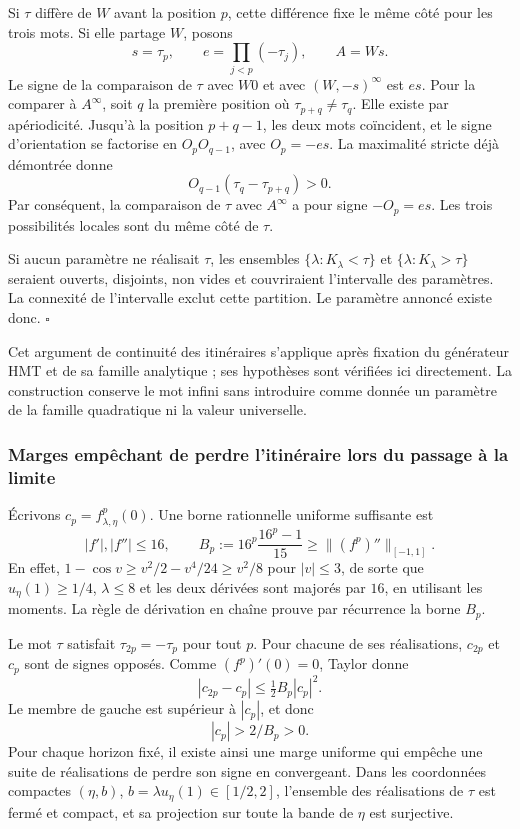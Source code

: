 Si \(\tau\) diffère de \(W\) avant la position \(p\), cette différence fixe le même côté pour les trois mots. Si elle partage \(W\), posons
\[
s=\tau_p,\qquad e=\prod_{j<p}(-\tau_j),\qquad A=Ws.
\]
Le signe de la comparaison de \(\tau\) avec \(W0\) et avec \((W,-s)^\infty\) est \(es\). Pour la comparer à \(A^\infty\), soit \(q\) la première position où \(\tau_{p+q}\ne\tau_q\). Elle existe par apériodicité. Jusqu’à la position \(p+q-1\), les deux mots coïncident, et le signe d’orientation se factorise en \(O_pO_{q-1}\), avec \(O_p=-es\). La maximalité stricte déjà démontrée donne
\[
O_{q-1}(\tau_q-\tau_{p+q})>0.
\]
Par conséquent, la comparaison de \(\tau\) avec \(A^\infty\) a pour signe \(-O_p=es\). Les trois possibilités locales sont du même côté de \(\tau\).

Si aucun paramètre ne réalisait \(\tau\), les ensembles \(\{\lambda:K_\lambda<\tau\}\) et \(\{\lambda:K_\lambda>\tau\}\) seraient ouverts, disjoints, non vides et couvriraient l’intervalle des paramètres. La connexité de l’intervalle exclut cette partition. Le paramètre annoncé existe donc. \(\square\)

Cet argument de continuité des itinéraires s’applique après fixation du générateur HMT et de sa famille analytique ; ses hypothèses sont vérifiées ici directement. La construction conserve le mot infini sans introduire comme donnée un paramètre de la famille quadratique ni la valeur universelle.

\subsubsection{Marges empêchant de perdre l’itinéraire lors du passage à la limite}
\label{hmtfg:prolongacion:6.2}

Écrivons \(c_p=f_{\lambda,\eta}^p(0)\). Une borne rationnelle uniforme suffisante est
\[
|f'|,|f''|\le16,\qquad
B_p:=16^p\frac{16^p-1}{15}\ge\|(f^p)''\|_{[-1,1]}.
\]
En effet, \(1-\cos v\ge v^2/2-v^4/24\ge v^2/8\) pour \(|v|\le3\), de sorte que \(u_\eta(1)\ge1/4\), \(\lambda\le8\) et les deux dérivées sont majorés par \(16\), en utilisant les moments. La règle de dérivation en chaîne prouve par récurrence la borne \(B_p\).

Le mot \(\tau\) satisfait \(\tau_{2p}=-\tau_p\) pour tout \(p\). Pour chacune de ses réalisations, \(c_{2p}\) et \(c_p\) sont de signes opposés. Comme \((f^p)'(0)=0\), Taylor donne
\[
|c_{2p}-c_p|\le\tfrac12B_p|c_p|^2.
\]
Le membre de gauche est supérieur à \(|c_p|\), et donc
\[
\boxed{|c_p|>2/B_p>0.}
\]
Pour chaque horizon fixé, il existe ainsi une marge uniforme qui empêche une suite de réalisations de perdre son signe en convergeant. Dans les coordonnées compactes \((\eta,b)\), \(b=\lambda u_\eta(1)\in[1/2,2]\), l’ensemble des réalisations de \(\tau\) est fermé et compact, et sa projection sur toute la bande de \(\eta\) est surjective.


